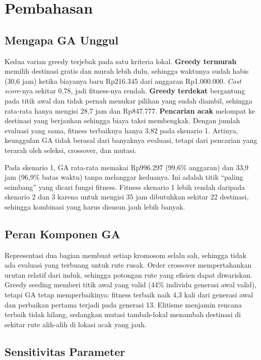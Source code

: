 \section{Pembahasan}
\label{sec:pembahasan}

\subsection{Mengapa GA Unggul}

Kedua varian greedy terjebak pada satu kriteria lokal. \textbf{Greedy termurah} memilih destinasi gratis dan murah lebih dulu, sehingga waktunya sudah habis (30,6 jam) ketika biayanya baru Rp216.345 dari anggaran Rp1.000.000. \textit{Cost score}-nya sekitar 0,78, jadi fitness-nya rendah. \textbf{Greedy terdekat} bergantung pada titik awal dan tidak pernah menukar pilihan yang sudah diambil, sehingga rata-rata hanya mengisi 28,7 jam dan Rp847.777. \textbf{Pencarian acak} melompat ke destinasi yang berjauhan sehingga biaya taksi membengkak. Dengan jumlah evaluasi yang sama, fitness terbaiknya hanya 3,82 pada skenario 1. Artinya, keunggulan GA tidak berasal dari banyaknya evaluasi, tetapi dari pencarian yang terarah oleh seleksi, crossover, dan mutasi.

Pada skenario 1, GA rata-rata memakai Rp996.297 (99,6\% anggaran) dan 33,9 jam (96,9\% batas waktu) tanpa melanggar keduanya. Ini adalah titik ``paling seimbang'' yang dicari fungsi fitness. Fitness skenario 1 lebih rendah daripada skenario 2 dan 3 karena untuk mengisi 35 jam dibutuhkan sekitar 22 destinasi, sehingga kombinasi yang harus disusun jauh lebih banyak.

\subsection{Peran Komponen GA}

Representasi dua bagian membuat setiap kromosom selalu sah, sehingga tidak ada evaluasi yang terbuang untuk rute rusak. Order crossover mempertahankan urutan relatif dari induk, sehingga potongan rute yang efisien dapat diwariskan. Greedy seeding memberi titik awal yang valid (44\% individu generasi awal valid), tetapi GA tetap memperbaikinya: fitness terbaik naik 4,3 kali dari generasi awal dan perbaikan pertama terjadi pada generasi 13. Elitisme menjamin rencana terbaik tidak hilang, sedangkan mutasi tambah-lokal menambah destinasi di sekitar rute alih-alih di lokasi acak yang jauh.

\subsection{Sensitivitas Parameter}

